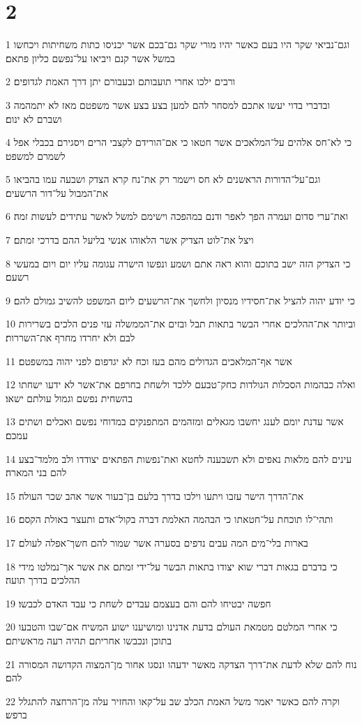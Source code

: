 \chapter{2}

\par 1 וגם־נביאי שקר היו בעם כאשר יהיו מורי שקר גם־בכם אשר יכניסו כתות משחיתות ויכחשו במשל אשר קנם ויביאו על־נפשם כליון פתאם׃
\par 2 ורבים ילכו אחרי תועבותם ובעבורם יתן דרך האמת לגדופים׃
\par 3 ובדברי בדוי יעשו אתכם למסחר להם למען בצע בצע אשר משפטם מאז לא יתמהמה ושברם לא ינום׃
\par 4 כי לא־חס אלהים על־המלאכים אשר חטאו כי אם־הורידם לקצבי הרים ויסגירם בכבלי אפל לשמרם למשפט׃
\par 5 וגם־על־הדורות הראשנים לא חס וישמר רק את־נח קרא הצדק ושבעה עמו בהביאו את־המבול על־דור הרשעים׃
\par 6 ואת־ערי סדום ועמרה הפך לאפר ודנם במהפכה וישימם למשל לאשר עתידים לעשות זמה׃
\par 7 ויצל את־לוט הצדיק אשר הלאוהו אנשי בליעל ההם בדרכי זמתם׃
\par 8 כי הצדיק הזה ישב בתוכם והוא ראה אתם ושמע ונפשו הישרה עגומה עליו יום ויום במעשי רשעם׃
\par 9 כי יודע יהוה להציל את־חסידיו מנסיון ולחשך את־הרשעים ליום המשפט להשיב גמולם להם׃
\par 10 וביותר את־ההלכים אחרי הבשר בתאות תבל ובזים את־הממשלה עזי פנים הלכים בשרירות לבם ולא יחרדו מחרף את־השררות׃
\par 11 אשר אף־המלאכים הגדולים מהם בעז וכח לא יגדפום לפני יהוה במשפטם׃
\par 12 ואלה כבהמות הסכלות הנולדות כחק־טבעם ללכד ולשחת בחרפם את־אשר לא ידעו ישחתו בהשחית נפשם וגמול עולתם ישאו׃
\par 13 אשר עדנת יומם לענג יחשבו מגאלים ומזהמים המתפנקים במדוחי נפשם ואכלים ושתים עמכם׃
\par 14 עינים להם מלאות נאפים ולא תשבענה לחטא ואת־נפשות הפתאים יצודדו ולב מלמד־בצע להם בני המארה׃
\par 15 את־הדרך הישר עזבו ויתעו וילכו בדרך בלעם בן־בעור אשר אהב שכר העולה׃
\par 16 ותהי־לו תוכחת על־חטאתו כי הבהמה האלמת דברה בקול־אדם ותעצר באולת הקסם׃
\par 17 בארות בלי־מים המה עבים נדפים בסערה אשר שמור להם חשך־אפלה לעולם׃
\par 18 כי בדברם בגאות דברי שוא יצודו בתאות הבשר על־ידי זמתם את אשר אך־נמלטו מידי ההלכים בדרך תועה׃
\par 19 חפשה יבטיחו להם והם בעצמם עבדים לשחת כי עבד האדם לכבשו׃
\par 20 כי אחרי המלטם מטמאת העולם בדעת אדנינו ומושיענו ישוע המשיח אם־שבו והטבעו בתוכן ונכבשו אחריתם תהיה רעה מראשיתם׃
\par 21 נוח להם שלא לדעת את־דרך הצדקה מאשר ידעהו ונסגו אחור מן־המצוה הקדושה המסורה להם׃
\par 22 וקרה להם כאשר יאמר משל האמת הכלב שב על־קאו והחזיר עלה מן־הרחצה להתגלל ברפש׃

